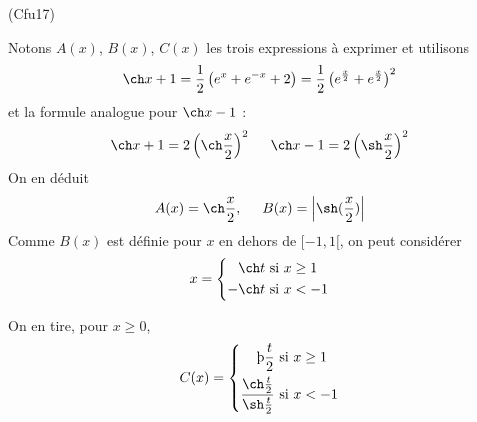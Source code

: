 \begin{tiny}(Cfu17)\end{tiny} Notons $A(x)$, $B(x)$, $C(x)$ les trois expressions à exprimer et utilisons
\begin{displaymath}
 \ch x + 1 = \frac{1}{2}\left(e^x + e^{-x} +2\right)
= \frac{1}{2}\left(e^{\frac{x}{2}}+e^{\frac{x}{2}} \right)^2  
\end{displaymath}
et la formule analogue pour $\ch x -1$ :
\begin{displaymath}
  \ch x + 1 = 2 \left( \ch\frac{x}{2}\right)^2 \hspace{0.5cm}\ch x - 1 = 2 \left( \sh\frac{x}{2}\right)^2 
\end{displaymath}
On en déduit
\begin{displaymath}
  A(x) =\ch\frac{x}{2},\hspace{0.5cm}
  B(x) = \left| \sh(\frac{x}{2})\right|
\end{displaymath}
Comme $B(x)$ est définie pour $x$ en dehors de $[-1,1[$, on peut considérer
\begin{displaymath}
x =
\left\lbrace 
\begin{aligned}
\ch t   &\text{ si } x\geq 1 \\
 -\ch t &\text{ si } x< -1   
\end{aligned}
\right. 
\end{displaymath}

On en tire, pour $x\geq 0$,
\begin{displaymath}
  C(x) = 
\left\lbrace  
\begin{aligned}
  \th\frac{t}{2} &\text{ si } x\geq 1 \\
  \frac{\ch \frac{t}{2}}{\sh \frac{t}{2}} &\text{ si } x < -1 
\end{aligned}
\right. 
\end{displaymath}
